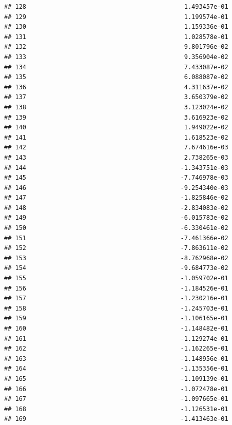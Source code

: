 \documentclass[
]{article}
\begin{document}
\begin{verbatim}
## 128                                           1.493457e-01
## 129                                           1.199574e-01
## 130                                           1.159336e-01
## 131                                           1.028578e-01
## 132                                           9.801796e-02
## 133                                           9.356904e-02
## 134                                           7.433087e-02
## 135                                           6.088087e-02
## 136                                           4.311637e-02
## 137                                           3.650379e-02
## 138                                           3.123024e-02
## 139                                           3.616923e-02
## 140                                           1.949022e-02
## 141                                           1.618523e-02
## 142                                           7.674616e-03
## 143                                           2.738265e-03
## 144                                          -1.343751e-03
## 145                                          -7.746978e-03
## 146                                          -9.254340e-03
## 147                                          -1.825846e-02
## 148                                          -2.834083e-02
## 149                                          -6.015783e-02
## 150                                          -6.330461e-02
## 151                                          -7.461366e-02
## 152                                          -7.863611e-02
## 153                                          -8.762968e-02
## 154                                          -9.684773e-02
## 155                                          -1.059702e-01
## 156                                          -1.184526e-01
## 157                                          -1.230216e-01
## 158                                          -1.245703e-01
## 159                                          -1.106165e-01
## 160                                          -1.148482e-01
## 161                                          -1.129274e-01
## 162                                          -1.162265e-01
## 163                                          -1.148956e-01
## 164                                          -1.135356e-01
## 165                                          -1.109139e-01
## 166                                          -1.072478e-01
## 167                                          -1.097665e-01
## 168                                          -1.126531e-01
## 169                                          -1.413463e-01

\end{verbatim}
\end{document}
